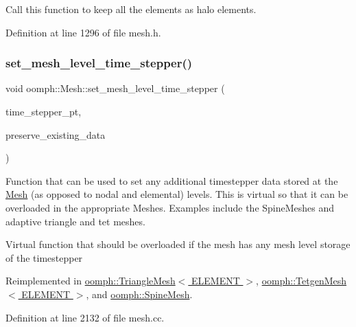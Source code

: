 Call this function to keep all the elements as halo elements. 



Definition at line 1296 of file mesh.\+h.

\mbox{\label{classoomph_1_1Mesh_a52c30b4ebc67038e137a5de1c5d422e5}} 
\subsubsection{\texorpdfstring{set\+\_\+mesh\+\_\+level\+\_\+time\+\_\+stepper()}{set\_mesh\_level\_time\_stepper()}}
{\footnotesize\ttfamily void oomph\+::\+Mesh\+::set\+\_\+mesh\+\_\+level\+\_\+time\+\_\+stepper (\begin{DoxyParamCaption}\item[{\hyperlink{classoomph_1_1TimeStepper}{Time\+Stepper} $\ast$const \&}]{time\+\_\+stepper\+\_\+pt,  }\item[{const bool \&}]{preserve\+\_\+existing\+\_\+data }\end{DoxyParamCaption})\hspace{0.3cm}{\ttfamily [virtual]}}



Function that can be used to set any additional timestepper data stored at the \hyperlink{classoomph_1_1Mesh}{Mesh} (as opposed to nodal and elemental) levels. This is virtual so that it can be overloaded in the appropriate Meshes. Examples include the Spine\+Meshes and adaptive triangle and tet meshes. 

Virtual function that should be overloaded if the mesh has any mesh level storage of the timestepper 

Reimplemented in \hyperlink{classoomph_1_1TriangleMesh_abb1a6cb242b5d0e067a8e64b3ac50cfb}{oomph\+::\+Triangle\+Mesh$<$ E\+L\+E\+M\+E\+N\+T $>$}, \hyperlink{classoomph_1_1TetgenMesh_a9c0441ea7404e7ea404979955ffbb5dd}{oomph\+::\+Tetgen\+Mesh$<$ E\+L\+E\+M\+E\+N\+T $>$}, and \hyperlink{classoomph_1_1SpineMesh_ad858479b2509532604bc48a184ad55a9}{oomph\+::\+Spine\+Mesh}.



Definition at line 2132 of file mesh.\+cc.



